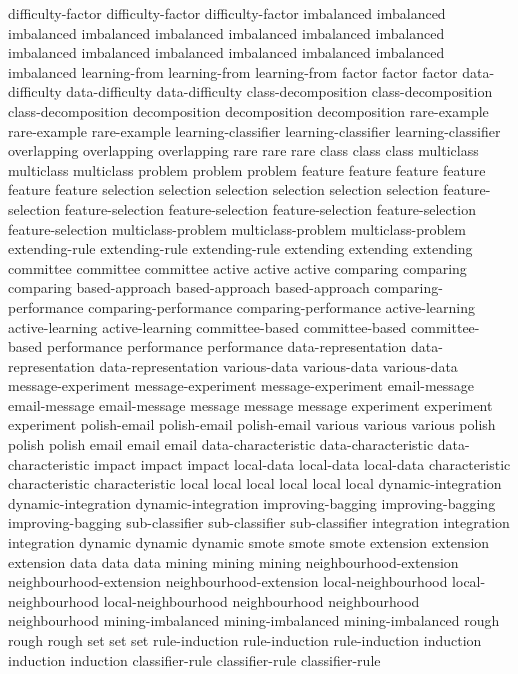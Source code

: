 difficulty-factor	difficulty-factor	difficulty-factor	
imbalanced	imbalanced	imbalanced	imbalanced	imbalanced	imbalanced	imbalanced	imbalanced	imbalanced	imbalanced	imbalanced	imbalanced	imbalanced	imbalanced	imbalanced	
learning-from	learning-from	learning-from	
factor	factor	factor	
data-difficulty	data-difficulty	data-difficulty	
class-decomposition	class-decomposition	class-decomposition	
decomposition	decomposition	decomposition	
rare-example	rare-example	rare-example	
learning-classifier	learning-classifier	learning-classifier	
overlapping	overlapping	overlapping	
rare	rare	rare	
class	class	class	
multiclass	multiclass	multiclass	
problem	problem	problem	
feature	feature	feature	feature	feature	feature	
selection	selection	selection	selection	selection	selection	
feature-selection	feature-selection	feature-selection	feature-selection	feature-selection	feature-selection	
multiclass-problem	multiclass-problem	multiclass-problem	
extending-rule	extending-rule	extending-rule	
extending	extending	extending	
committee	committee	committee	
active	active	active	
comparing	comparing	comparing	
based-approach	based-approach	based-approach	
comparing-performance	comparing-performance	comparing-performance	
active-learning	active-learning	active-learning	
committee-based	committee-based	committee-based	
performance	performance	performance	
data-representation	data-representation	data-representation	
various-data	various-data	various-data	
message-experiment	message-experiment	message-experiment	
email-message	email-message	email-message	
message	message	message	
experiment	experiment	experiment	
polish-email	polish-email	polish-email	
various	various	various	
polish	polish	polish	
email	email	email	
data-characteristic	data-characteristic	data-characteristic	
impact	impact	impact	
local-data	local-data	local-data	
characteristic	characteristic	characteristic	
local	local	local	local	local	local	
dynamic-integration	dynamic-integration	dynamic-integration	
improving-bagging	improving-bagging	improving-bagging	
sub-classifier	sub-classifier	sub-classifier	
integration	integration	integration	
dynamic	dynamic	dynamic	
smote	smote	smote	
extension	extension	extension	
data	data	data	
mining	mining	mining	
neighbourhood-extension	neighbourhood-extension	neighbourhood-extension	
local-neighbourhood	local-neighbourhood	local-neighbourhood	
neighbourhood	neighbourhood	neighbourhood	
mining-imbalanced	mining-imbalanced	mining-imbalanced	
rough	rough	rough	
set	set	set	
rule-induction	rule-induction	rule-induction	
induction	induction	induction	
classifier-rule	classifier-rule	classifier-rule	
